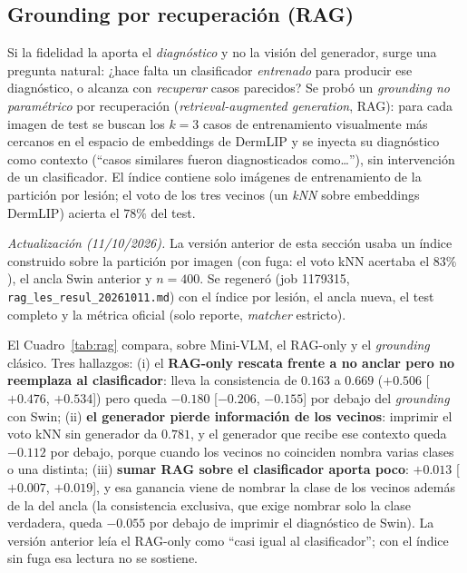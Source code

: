 \documentclass[11pt, a4paper]{article}
\begin{document}
\subsection{Grounding por recuperación (RAG)}
\label{sec:rag}
Si la fidelidad la aporta el \emph{diagnóstico} y no la visión del generador, surge una pregunta natural:
¿hace falta un clasificador \emph{entrenado} para producir ese diagnóstico, o alcanza con
\emph{recuperar} casos parecidos? Se probó un \emph{grounding no paramétrico} por recuperación
(\emph{retrieval-augmented generation}, RAG): para cada imagen de test se buscan los $k=3$ casos de
entrenamiento visualmente más cercanos en el espacio de embeddings de DermLIP y se inyecta su diagnóstico
como contexto (``casos similares fueron diagnosticados como\dots''), sin intervención de un clasificador.
El índice contiene solo imágenes de entrenamiento de la partición por lesión; el voto de los tres
vecinos (un \emph{kNN} sobre embeddings DermLIP) acierta el $78\%$ del test.

\emph{Actualización (11/10/2026).} La versión anterior de esta sección usaba un índice construido sobre la
partición por imagen (con fuga: el voto kNN acertaba el $83\%$), el ancla Swin anterior y $n=400$. Se
regeneró (job 1179315, \texttt{rag\_les\_resul\_20261011.md}) con el índice por lesión, el ancla nueva, el
test completo y la métrica oficial (solo reporte, \emph{matcher} estricto).

El Cuadro~\ref{tab:rag} compara, sobre Mini-VLM, el RAG-only y el \emph{grounding} clásico. Tres hallazgos:
(i) el \textbf{RAG-only rescata frente a no anclar pero no reemplaza al clasificador}: lleva la consistencia
de $0.163$ a $0.669$ ($+0.506$ [$+0.476$, $+0.534$]) pero queda $-0.180$ [$-0.206$, $-0.155$] por debajo del
\emph{grounding} con Swin; (ii) \textbf{el generador pierde información de los vecinos}: imprimir el voto kNN
sin generador da $0.781$, y el generador que recibe ese contexto queda $-0.112$ por debajo, porque cuando los
vecinos no coinciden nombra varias clases o una distinta; (iii) \textbf{sumar RAG sobre el clasificador
aporta poco}: $+0.013$ [$+0.007$, $+0.019$], y esa ganancia viene de nombrar la clase de los vecinos además
de la del ancla (la consistencia exclusiva, que exige nombrar solo la clase verdadera, queda $-0.055$ por
debajo de imprimir el diagnóstico de Swin). La versión anterior leía el RAG-only como ``casi igual al
clasificador''; con el índice sin fuga esa lectura no se sostiene.
\end{document}
